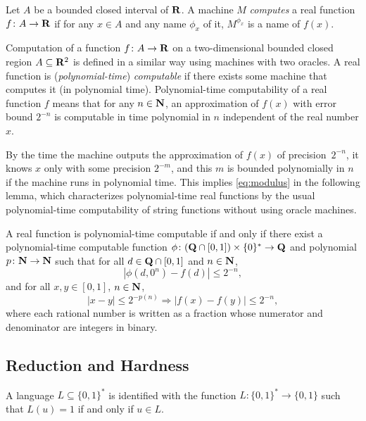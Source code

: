 \begin{definition}
Let $A$ be a bounded closed interval of\/ $\mathbf R$.
A machine $M$ \emph{computes} a real function $f \colon A \to \mathbf R$ 
if for any $x \in A$ and any name $\phi_x$ of it,
$M^{\phi_x}$ is a name of $f(x)$.
\end{definition}

Computation of a function $f \colon A \to \mathbf R$ on
a two-dimensional bounded closed region $A \subseteq \mathbf R ^2$ 
is defined in a similar way using machines with two oracles.
A real function is (\emph{polynomial-time}) \emph{computable} if there exists some machine that computes it (in polynomial time).
Polynomial-time computability of a real function $f$ means that
for any $n \in \mathbf N$, 
an approximation of $f(x)$ with error bound $2^{-n}$
is computable in time polynomial in $n$ 
independent of the real number $x$.

By the time the machine outputs the approximation of $f (x)$ of precision~$2 ^{-n}$, 
it knows $x$ only with some precision $2 ^{-m}$, 
and this $m$ is bounded polynomially in $n$ 
if the machine runs in polynomial time. 
This implies \eqref{eq:modulus} in the following lemma, 
which characterizes polynomial-time real functions
by the usual polynomial-time computability of string functions 
without using oracle machines. 

\begin{lemma}
 \label{lem:type1representation}
 A real function is polynomial-time computable if and only if
 there exist a polynomial-time computable function 
 $\phi \colon (\mathbf Q \cap [0, 1]) \times \{0\} ^* \to \mathbf Q$ and 
 polynomial $p \colon \mathbf N \to \mathbf N$ such that
 for all $d \in \mathbf Q \cap [0,1]$ and $n \in \mathbf N$,
 \begin{equation}
  |\phi(d, 0^n) - f(d)| \le 2^{-n},
 \end{equation}
 and for all $x, y \in [0, 1]$, $n \in \mathbf N$,
 \begin{equation} 
  |x-y| \le 2^{-p(n)} \Rightarrow |f(x) - f(y)| \le 2^{-n},
   \label{eq:modulus}
 \end{equation}
where each rational number is written
as a fraction whose numerator and denominator
are integers in binary.
\end{lemma}

\subsection{Reduction and Hardness}
A language $L \subseteq \{0, 1\} ^*$ is identified with the function
$L \colon \{0, 1\} ^* \to \{0, 1\}$ such that $L (u) = 1$ if and only if $u \in L$.

